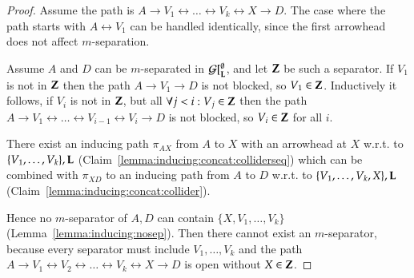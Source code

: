 \begin{proof}
Assume the path is $A \to V_1 \leftrightarrow \ldots \leftrightarrow V_k \leftrightarrow X \to D$. 
The case where the path starts with $A \leftrightarrow V_1$ can be handled identically, 
since the first arrowhead does not affect $m$-separation.

Assume $A$ and $D$ can be $m$-separated in  ${\cal G}[^\emptyset_{\bf L}$, and let ${\bf Z}$ be such a separator. If $V_1$ is not in ${\bf Z}$ then the path $A \to V_1 \to D$ is not blocked, so $V_1 \in {\bf Z}$. Inductively it follows, if $V_i$ is not in ${\bf Z}$, but all $\forall j<i: V_j\in{\bf Z}$  then the path $A \to V_1 \leftrightarrow \ldots \leftrightarrow V_{i-1} \leftrightarrow V_i \to D$ is not blocked, so $V_i \in {\bf Z}$ for all $i$.  


There exist an inducing path $\pi_{AX}$ from $A$ to $X$ with an arrowhead at $X$  
w.r.t. to $\{V_1,\ldots,V_k\},{\bf L}$ (Claim~\ref{lemma:inducing:concat:colliderseq})
which can be combined with $\pi_{XD}$ to an inducing path from $A$ to $D$ w.r.t.
to $\{V_1,\ldots,V_k,X\},{\bf L}$ (Claim~\ref{lemma:inducing:concat:collider}).




Hence no $m$-separator of $A,D$ can contain  $\{X,V_1,\ldots,V_k\}$ 
(Lemma~\ref{lemma:inducing:nosep}). 
Then there
cannot exist an $m$-separator, because every separator must include $V_1,\ldots,V_k$ and the path $A \to V_1 \leftrightarrow V_2 \leftrightarrow \ldots \leftrightarrow V_k \leftrightarrow X \to D$ is open without $X \in {\bf Z}$.
\end{proof}




